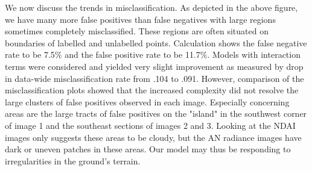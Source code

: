 \documentclass{article}\usepackage[]{graphicx}\usepackage[]{color}
\begin{document}
We now discuss the trends in misclassification. As depicted in the above figure, we have many more false positives than false negatives with large regions sometimes completely misclassified. These regions are often situated on boundaries of labelled and unlabelled points. Calculation shows the false negative rate to be 7.5$\%$ and the false positive rate to be 11.7$\%$. Models with interaction terms were considered and yielded very slight improvement as measured by drop in data-wide misclassification rate from .104 to .091. However, comparison of the misclassification plots showed that the increased complexity did not resolve the large clusters of false positives observed in each image. Especially concerning areas are the large tracts of false positives on the "island" in the southwest corner of image 1 and the southeast sections of images 2 and 3. Looking at the NDAI images only suggests these areas to be cloudy, but the AN radiance images have dark or uneven patches in these areas. Our model may thus be responding to irregularities in the ground's terrain.
\end{document}
